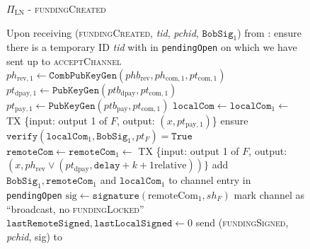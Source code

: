 \begin{figure}[!htbp]
  \begin{protocolbox}{$\Pi_{\mathrm{LN}}$ - \textsc{fundingCreated}}
    \begin{algorithmic}[1]
      \State Upon receiving (\textsc{fundingCreated}, \textit{tid},
      \textit{pchid}, $\mathtt{BobSig}_1$) from \bob:
      \Indent
        \State ensure there is a temporary ID \textit{tid} with \bob{} in
        \texttt{pendingOpen} on which we have sent up to \textsc{acceptChannel}
        \State $ph_{\mathrm{rev}, 1} \gets
        \mathtt{CombPubKeyGen}\left(phb_{\mathrm{rev}}, ph_{\mathrm{com}, 1},
        pt_{\mathrm{com}, 1}\right)$
        \State $pt_{\mathrm{dpay}, 1} \gets
        \texttt{PubKeyGen}\left(ptb_{\mathrm{dpay}}, pt_{\mathrm{com},
        1}\right)$
        \State $pt_{\mathrm{pay}, 1} \gets
        \texttt{PubKeyGen}\left(ptb_{\mathrm{pay}}, pt_{\mathrm{com}, 1}\right)$
        \State $\mathtt{localCom} \gets \mathtt{localCom}_1 \gets$ TX \{input:
        output 1 of $F$, output: $\left(x, pt_{\mathrm{pay}, 1}\right)$\}
        \State ensure $\mathtt{verify}\left(\mathtt{localCom}_1,
        \mathtt{BobSig}_1, pt_F\right) = \mathtt{True}$
        \State $\mathtt{remoteCom} \gets \mathtt{remoteCom}_1 \gets$ TX \{input:
        output 1 of $F$, output: $\left(x, ph_{\mathrm{rev}} \vee
        \left(pt_{\mathrm{dpay}}, \mathtt{delay} + k + 1 \text{
        relative}\right)\right)\}$
        \State add $\mathtt{BobSig}_1, \mathtt{remoteCom}_1$ and
        $\mathtt{localCom}_1$ to channel entry in \texttt{pendingOpen}
        \State $\mathrm{sig} \gets \mathtt{signature}\left(\mathrm{remoteCom}_1,
        sh_F\right)$
        \State mark channel as ``broadcast, no \textsc{fundingLocked}''
        \State $\mathtt{lastRemoteSigned}, \mathtt{lastLocalSigned} \gets 0$
        \State send (\textsc{fundingSigned}, \textit{pchid}, sig) to \bob{}
      \EndIndent
    \end{algorithmic}
  \end{protocolbox}
  \caption{}
  \label{alg:protocol:open:fundingCreated}
\end{figure}

